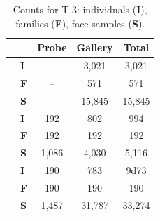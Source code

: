 \documentclass[letterpaper, 10 pt, conference]{ieeeconf}  %
\begin{document}
\begin{table}[b]
    \centering
    \caption{Counts for T-3: individuals (\textbf{I}), families (\textbf{F}), face samples (\textbf{S}).}
    \begin{tabular}{p{.1in}m{.1in}ccc}
    & &Probe &Gallery &Total\\\hline
     \parbox[t]{2mm}{
     }&\textbf{I} & --  & 3,021 & 3,021 \\
     &\textbf{F}  &-- & 571 & 571\\
     &\textbf{S} & --& 15,845 & 15,845 \\\hline
    
    \parbox[t]{2mm}{
    } &\textbf{I}  & 192 & 802  & 994  \\
     &\textbf{F} & 192 & 192 & 192  \\
     &\textbf{S}  &1,086  &4,030 &5,116 \\\hline
    


    \parbox[t]{2mm}{
    } &\textbf{I}& 190 & 783  & 9d73 \\
     &\textbf{F} &190  & 190  & 190   \\
     &\textbf{S}  &1,487  & 31,787 & 33,274\\\hline
    
    \end{tabular}\label{tbl:track3:counts} 
\end{table}
\end{document}
